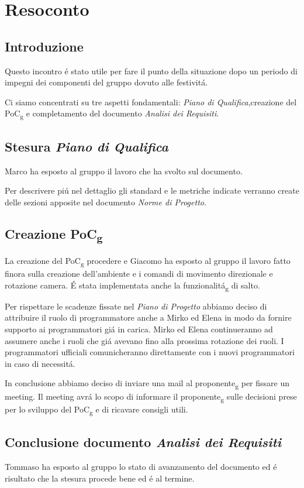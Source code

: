\section{Resoconto}
\subsection{Introduzione}
Questo incontro é stato utile per fare il punto della situazione dopo un periodo di impegni
dei componenti del gruppo dovuto alle festivitá.

Ci siamo concentrati su tre aspetti fondamentali: \textit{Piano di Qualifica},creazione del PoC\textsubscript{g} e completamento 
del documento \textit{Analisi dei Requisiti}.
\subsection{Stesura \textit{Piano di Qualifica}}
Marco ha esposto al gruppo il lavoro che ha svolto sul documento.

Per descrivere piú nel dettaglio gli standard e le metriche indicate verranno create
delle sezioni apposite nel documento \textit{Norme di Progetto}.
\subsection{Creazione PoC\textsubscript{g}}
La creazione del PoC\textsubscript{g} procedere e Giacomo ha esposto al gruppo il lavoro
fatto finora sulla creazione dell'ambiente e i comandi di movimento direzionale e rotazione camera.
É stata implementata anche la funzionalitá\textsubscript{g} di salto.

Per rispettare le scadenze fissate nel \textit{Piano di Progetto} abbiamo deciso di attribuire il ruolo di programmatore anche a Mirko ed Elena 
in modo da fornire supporto ai programmatori giá in carica.
Mirko ed Elena continueranno ad assumere anche i ruoli che giá avevano fino alla prossima rotazione dei ruoli.
I programmatori ufficiali comunicheranno direttamente con i nuovi programmatori in caso di necessitá.

In conclusione abbiamo deciso di inviare una mail al proponente\textsubscript{g} per fissare un meeting.
Il meeting avrá lo scopo di informare il proponente\textsubscript{g} sulle decisioni prese per lo sviluppo del PoC\textsubscript{g} e 
di ricavare consigli utili. 
\subsection{Conclusione documento \textit{Analisi dei Requisiti}}
Tommaso ha esposto al gruppo lo stato di avanzamento del documento ed é risultato che la stesura procede bene ed
é al termine.
